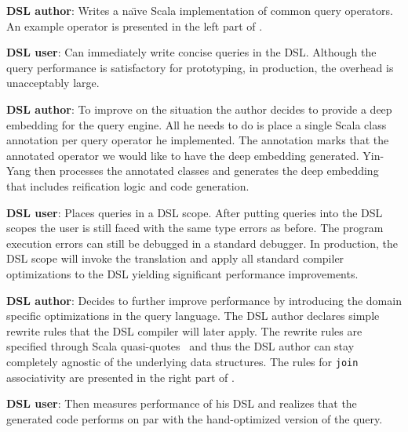\documentclass{llncs}
\newcommand{\scode}[1]{\lstinline[language=Scala,columns=fixed,basicstyle=\ttfamily,keywordstyle=\ttfamily]|#1|}
\newcommand{\code}[1]{\scode{#1}}
\newcommand{\tool}{Yin-Yang\xspace}
\begin{document}
  {\bf DSL author}: Writes a na\"{\i}ve Scala implementation of common query operators. An example operator is presented in the left part of .

  {\bf DSL user}: Can immediately write concise queries in the DSL. Although the query performance is satisfactory for prototyping, in production, the overhead is unacceptably large.

  {\bf DSL author}: To improve on the situation the author decides to provide a deep embedding for the query engine. All he needs to do is place a single Scala class annotation per query operator he implemented. The annotation marks that the annotated operator we would like to have the deep embedding generated. \tool then processes the annotated classes and generates the deep embedding that includes reification logic and code generation.

  {\bf DSL user}: Places queries in a DSL scope. After putting queries into the DSL scopes the user is still faced with the same type errors as before. The program execution errors can still be debugged in a standard debugger. In production, the DSL scope will invoke the translation and apply all standard compiler optimizations to the DSL yielding significant performance improvements.

  {\bf DSL author}: Decides to further improve performance by introducing the domain specific optimizations in the query language. The DSL author declares simple rewrite rules that the DSL compiler will later apply. The rewrite rules are specified through Scala quasi-quotes~\cite{shabalin2013quasiquotes} and thus the DSL author can stay completely agnostic of the underlying data structures. The rules for \code{join} associativity are presented in the right part of .
  
  {\bf DSL user}: Then measures performance of his DSL and realizes that the generated code performs on par with the hand-optimized version of the query.




\end{document}

